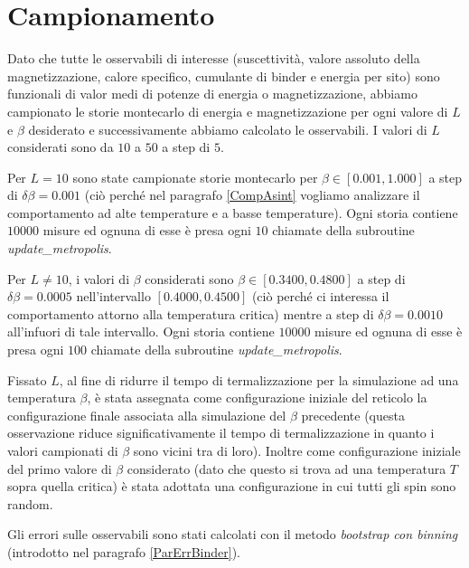 \documentclass[10pt,a4paper]{article}
\begin{document}
\section{Campionamento}\label{Campionamento}
Dato che tutte le osservabili di interesse (suscettività, valore assoluto della magnetizzazione, calore specifico, cumulante di binder e energia per sito) sono funzionali di valor medi di potenze di energia o magnetizzazione, abbiamo campionato le storie montecarlo di energia e magnetizzazione per ogni valore di $L$ e $\beta$ desiderato e successivamente abbiamo calcolato le osservabili. I valori di $L$ considerati sono da $10$ a $50$ a step di $5$. 



Per $L = 10$ sono state campionate storie montecarlo per $\beta\in[0.001,1.000]$ a step di $\delta \beta=0.001$ (ciò perché nel paragrafo \ref{CompAsint} vogliamo analizzare il comportamento ad alte temperature e a basse temperature). Ogni storia contiene $10000$ misure ed ognuna di esse è presa ogni $10$ chiamate della subroutine \emph{update\_metropolis}. 


Per $L\ne 10$, i valori di $\beta$ considerati sono $\beta\in[0.3400,0.4800]$ a step di $\delta \beta=0.0005$ nell'intervallo $[0.4000,0.4500]$ (ciò perché ci interessa il comportamento attorno alla temperatura critica) mentre a step di $\delta \beta=0.0010$ all'infuori di tale intervallo. Ogni storia contiene $10000$ misure ed ognuna di esse è presa ogni $100$ chiamate della subroutine \emph{update\_metropolis}. 



Fissato $L$, al fine di ridurre il tempo di termalizzazione per la simulazione ad una temperatura $\beta$, è stata assegnata come configurazione iniziale del reticolo la configurazione finale associata alla simulazione del $\beta$ precedente (questa osservazione riduce significativamente il tempo di termalizzazione in quanto i valori campionati di $\beta$ sono vicini tra di loro). Inoltre come configurazione iniziale del primo valore di $\beta$ considerato (dato che questo si trova ad una temperatura $T$ sopra quella critica) è stata adottata una configurazione in cui tutti gli spin sono random.

Gli errori sulle osservabili sono stati calcolati con il metodo \emph{bootstrap con binning} (introdotto nel paragrafo \ref{ParErrBinder}).
 
\end{document}

